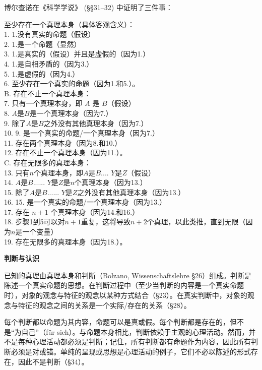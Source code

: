 博尔查诺在《科学学说》 (§§31–32) 中证明了三件事：

至少存在一个真理本身（具体客观含义）：\\
1. 1.没有真实的命题（假设）\\
2. 1.是一个命题（显然）\\
3. 1.是真实的（假设）并且是虚假的（因为1.）\\
4. 1.是自相矛盾的（因为3.）\\
5. 1.是虚假的（因为4.）\\
6. 至少存在一个真实的命题（因为1.和5.）。\\
B. 存在不止一个真理本身：\\
7. 只有一个真理本身，即 \(A\) 是 \(B\)（假设）\\
8. \(A\)是\(B\)是一个真理本身（因为7.）\\
9. 除了\(A\)是\(B \)之外没有其他真理本身（因为7.）\\
10. 9. 是一个真实的命题/一个真理本身（因为7.）\\
11. 存在两个真理本身（因为8.和10.）\\
12. 存在不止一个真理本身（因为11.）。\\
C. 存在无限多的真理本身：\\
13. 只有\(n\)个真理本身，即\(A\)是\(B\)....  \(Y\)是\(Z\)（假设）\\
14. \(A\)是\(B\)...... \(Y\)是\(Z\)是\(n\)个真理本身（因为13.）\\
15. 除了\(A\)是\(B\)...... \(Y\)是\(Z\)之外没有其他真理本身（因为13.）\\
16. 15. 是一个真实的命题/一个真理本身（因为13.）\\
17. 存在 \(n+1\) 个真理本身（因为14.和16.）\\
18. 步骤1到5可以对\(n+1\)重复，这将导致\(n+2\)个真理，以此类推，直到无限（因为\(n\)是一个变量）\\
19. 存在无限多的真理本身（因为18.）。

\textbf{判断与认识}
  
已知的真理由真理本身和判断（Bolzano, Wissenschaftslehre §26）组成。判断是陈述一个真实命题的思想。在判断过程中（至少当判断的内容是一个真实命题时），对象的观念与特征的观念以某种方式结合（§23）。在真实判断中，对象的观念与特征的观念之间的关系是一个实际/存在的关系（§28）。

每个判断都以命题为其内容，命题可以是真或假。每个判断都是存在的，但不是“为自己”（für sich）。与命题本身相比，判断依赖于主观的心理活动。然而，并不是每种心理活动都必须是判断；记住，所有判断都有命题作为内容，因此所有判断必须是对或错。单纯的呈现或思想是心理活动的例子，它们不必以陈述的形式存在，因此不是判断（§34）。

